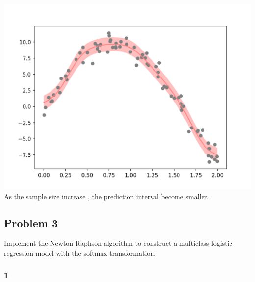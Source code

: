 \documentclass{article}
\begin{document}
\includegraphics[width=\textwidth]{80sample_predict.png}\\

As the sample size increase , the prediction interval become smaller.

\subsection*{Problem 3}
Implement the Newton-Raphson algorithm to construct a multiclass logistic regression model with the softmax transformation.

\subsubsection*{1}
\end{document}
